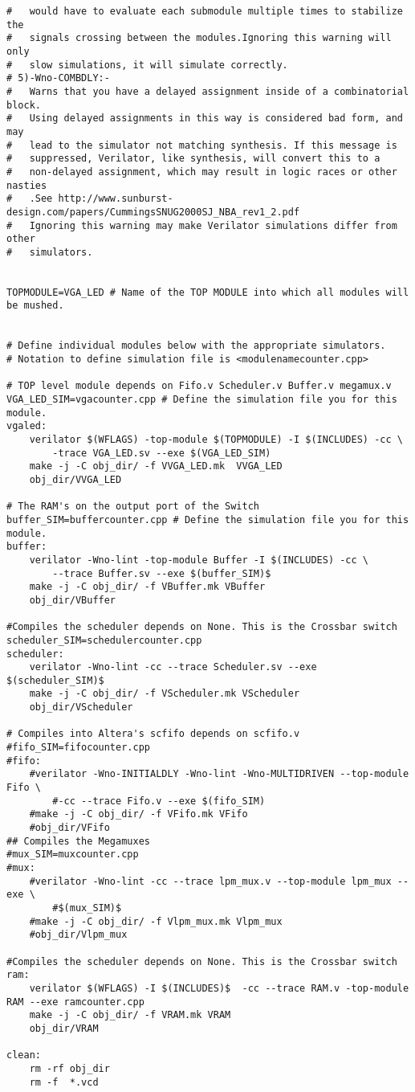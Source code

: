 \documentclass[twoside,12pt,fleqn]{book} %
\begin{document}
\begin{lstlisting}
# 	would have to evaluate each submodule multiple times to stabilize the 
# 	signals crossing between the modules.Ignoring this warning will only 
# 	slow simulations, it will simulate correctly.
# 5)-Wno-COMBDLY:-
# 	Warns that you have a delayed assignment inside of a combinatorial block.
# 	Using delayed assignments in this way is considered bad form, and may 
# 	lead to the simulator not matching synthesis. If this message is
# 	suppressed, Verilator, like synthesis, will convert this to a 
# 	non-delayed assignment, which may result in logic races or other nasties
# 	.See http://www.sunburst-design.com/papers/CummingsSNUG2000SJ_NBA_rev1_2.pdf
#	Ignoring this warning may make Verilator simulations differ from other
#	simulators.


TOPMODULE=VGA_LED # Name of the TOP MODULE into which all modules will be mushed.


# Define individual modules below with the appropriate simulators.
# Notation to define simulation file is <modulenamecounter.cpp>

# TOP level module depends on Fifo.v Scheduler.v Buffer.v megamux.v
VGA_LED_SIM=vgacounter.cpp # Define the simulation file you for this module.
vgaled:
	verilator $(WFLAGS) -top-module $(TOPMODULE) -I $(INCLUDES) -cc \
		-trace VGA_LED.sv --exe $(VGA_LED_SIM) 
	make -j -C obj_dir/ -f VVGA_LED.mk  VVGA_LED 
	obj_dir/VVGA_LED

# The RAM's on the output port of the Switch
buffer_SIM=buffercounter.cpp # Define the simulation file you for this module.
buffer: 
	verilator -Wno-lint -top-module Buffer -I $(INCLUDES) -cc \
		--trace Buffer.sv --exe $(buffer_SIM)$
	make -j -C obj_dir/ -f VBuffer.mk VBuffer
	obj_dir/VBuffer

#Compiles the scheduler depends on None. This is the Crossbar switch 
scheduler_SIM=schedulercounter.cpp
scheduler:
	verilator -Wno-lint -cc --trace Scheduler.sv --exe $(scheduler_SIM)$
	make -j -C obj_dir/ -f VScheduler.mk VScheduler
	obj_dir/VScheduler

# Compiles into Altera's scfifo depends on scfifo.v
#fifo_SIM=fifocounter.cpp
#fifo:
	#verilator -Wno-INITIALDLY -Wno-lint -Wno-MULTIDRIVEN --top-module Fifo \
		#-cc --trace Fifo.v --exe $(fifo_SIM) 
	#make -j -C obj_dir/ -f VFifo.mk VFifo
	#obj_dir/VFifo
## Compiles the Megamuxes
#mux_SIM=muxcounter.cpp
#mux:
	#verilator -Wno-lint -cc --trace lpm_mux.v --top-module lpm_mux --exe \
		#$(mux_SIM)$ 
	#make -j -C obj_dir/ -f Vlpm_mux.mk Vlpm_mux
	#obj_dir/Vlpm_mux

#Compiles the scheduler depends on None. This is the Crossbar switch 
ram:
	verilator $(WFLAGS) -I $(INCLUDES)$  -cc --trace RAM.v -top-module RAM --exe ramcounter.cpp
	make -j -C obj_dir/ -f VRAM.mk VRAM
	obj_dir/VRAM

clean:
	rm -rf obj_dir
	rm -f  *.vcd
\end{lstlisting}
\end{document}
